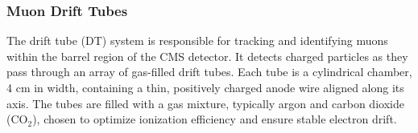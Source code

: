 







\subsubsection{Muon Drift Tubes}

The drift tube (DT) system is responsible for tracking and identifying muons within the barrel region of the CMS detector. It detects charged particles as they pass through an array of gas-filled drift tubes. Each tube is a cylindrical chamber, 4 cm in width, containing a thin, positively charged anode wire aligned along its axis. The tubes are filled with a gas mixture, typically argon and carbon dioxide (CO$_2$), chosen to optimize ionization efficiency and ensure stable electron drift.

